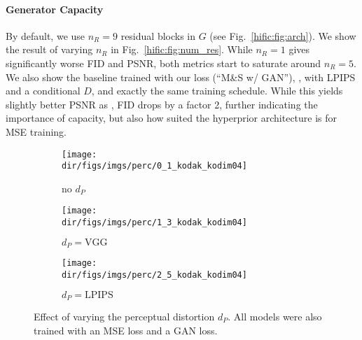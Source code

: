\paragraph{Generator Capacity}
By default, we use $n_R{=}9$ residual blocks in $G$ (see Fig.~\ref{hific:fig:arch}). We show the result of varying $n_R$ in Fig.~\ref{hific:fig:num_res}. While $n_R{=}1$ gives significantly worse FID and PSNR, both metrics start to saturate around $n_R{=}5$. We also show the \eblminnen baseline trained with our loss (``M\&S w/ GAN''), \ie, with LPIPS and a conditional $D$, and exactly the same training schedule. While this yields slightly better PSNR as \name, FID drops by a factor 2, further indicating the importance of capacity, but also how suited the hyperprior architecture is for MSE training.  


\begin{figure}
\tiny
\centering
\captionsetup[subfigure]{skip=1pt,singlelinecheck=false}
\begin{subfigure}{0.33\textwidth}
\texttt{[image: \\dir/figs/imgs/perc/0\_1\_kodak\_kodim04]}
\caption{\label{hific:fig:perc:no}no $d_P$}
\end{subfigure}
\begin{subfigure}{0.33\textwidth}
\texttt{[image: \\dir/figs/imgs/perc/1\_3\_kodak\_kodim04]}
\caption{\label{hific:fig:perc:vgg}$d_P=\text{VGG}$}
\end{subfigure}
\begin{subfigure}{0.33\textwidth}
\texttt{[image: \\dir/figs/imgs/perc/2\_5\_kodak\_kodim04]}
\caption{\label{hific:fig:perc:lpips}$d_P=\text{LPIPS}$}
\end{subfigure}
\caption{\label{hific:fig:perc}Effect of varying the perceptual distortion $d_P$. All models were also trained with an MSE loss and a GAN loss.
}
\end{figure}

